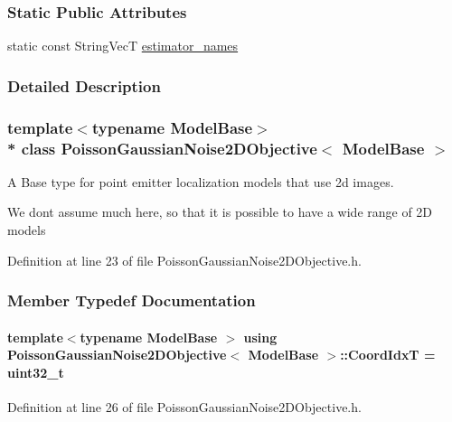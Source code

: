 \subsubsection*{Static Public Attributes}
\begin{DoxyCompactItemize}
\item 
static const String\+VecT \hyperlink{classPoissonGaussianNoise2DObjective_afc77f6a06f55c371a831f9e1ecc82ee3}{estimator\+\_\+names}
\end{DoxyCompactItemize}


\subsubsection{Detailed Description}
\subsubsection*{template$<$typename Model\+Base$>$\\*
class Poisson\+Gaussian\+Noise2\+D\+Objective$<$ Model\+Base $>$}

A Base type for point emitter localization models that use 2d images. 

We don\textquotesingle{}t assume much here, so that it is possible to have a wide range of 2D models 

Definition at line 23 of file Poisson\+Gaussian\+Noise2\+D\+Objective.\+h.



\subsubsection{Member Typedef Documentation}
\paragraph[{\texorpdfstring{Coord\+IdxT}{CoordIdxT}}]{\setlength{\rightskip}{0pt plus 5cm}template$<$typename Model\+Base $>$ using {\bf Poisson\+Gaussian\+Noise2\+D\+Objective}$<$ Model\+Base $>$\+::{\bf Coord\+IdxT} =  uint32\+\_\+t}\hypertarget{classPoissonGaussianNoise2DObjective_a4167a20571c56d874f26f7432e5e3232}{}\label{classPoissonGaussianNoise2DObjective_a4167a20571c56d874f26f7432e5e3232}


Definition at line 26 of file Poisson\+Gaussian\+Noise2\+D\+Objective.\+h.

